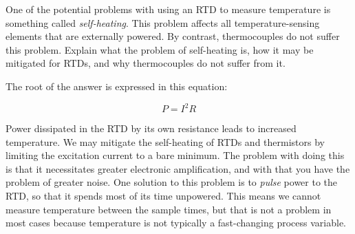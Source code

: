 

One of the potential problems with using an RTD to measure temperature is something called {\it self-heating}.  This problem affects all temperature-sensing elements that are externally powered.  By contrast, thermocouples do not suffer this problem.  Explain what the problem of self-heating is, how it may be mitigated for RTDs, and why thermocouples do not suffer from it.







The root of the answer is expressed in this equation:

$$P = I^2 R$$

Power dissipated in the RTD by its own resistance leads to increased temperature.  We may mitigate the self-heating of RTDs and thermistors by limiting the excitation current to a bare minimum.  The problem with doing this is that it necessitates greater electronic amplification, and with that you have the problem of greater noise.  One solution to this problem is to {\it pulse} power to the RTD, so that it spends most of its time unpowered.  This means we cannot measure temperature between the sample times, but that is not a problem in most cases because temperature is not typically a fast-changing process variable.












